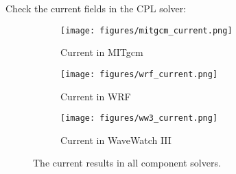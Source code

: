 
Check the current fields in the CPL solver:

\begin{figure}[h!]
\centering
  \begin{subfigure}[b]{0.3\linewidth}
  \texttt{[image: figures/mitgcm\_current.png]}
  \caption{Current in MITgcm}
  \end{subfigure}
  \begin{subfigure}[b]{0.3\linewidth}
  \texttt{[image: figures/wrf\_current.png]}
  \caption{Current in WRF}
  \end{subfigure}
  \begin{subfigure}[b]{0.3\linewidth}
  \texttt{[image: figures/ww3\_current.png]}
  \caption{Current in WaveWatch III}
  \end{subfigure}
\caption{The current results in all component solvers.}
\label{fig:current}
\end{figure}
